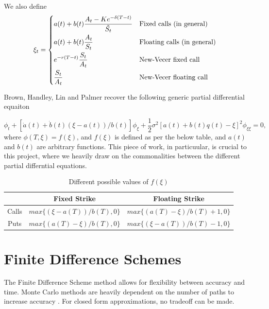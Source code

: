 \documentclass[12pt]{report}
\begin{document}
We also define
\begin{equation}
  \xi_t =
  \begin{dcases*}
    a(t) + b(t) \frac{A_t - Ke^{-\delta(T-t)}}{\tilde{S_t}} & Fixed calls (in general) \\
    a(t) + b(t) \frac{A_t}{S_t} & Floating calls (in general) \\
    e^{-r(T-t)}\frac{S_t}{A_t} & New-Vecer fixed call \\
    \frac{S_t}{A_t} & New-Vecer floating call
  \end{dcases*}
\end{equation}

Brown, Handley, Lin and Palmer\cite{main_paper} recover the following generic partial differential equaiton

\begin{equation}
  \phi_t + [\dot{a}(t) + \dot{b}(t)(\xi - a(t))/b(t)]\phi_\xi + \frac{1}{2}\sigma^2[a(t)+b(t)q(t) - \xi]^2\phi_{\xi\xi} = 0,
\end{equation}
where \(\phi(T, \xi) = f(\xi)\), and \(f(\xi)\) is defined as per the below table, and \(a(t)\) and \(b(t)\) are arbitrary functions. This piece of work, in particuular, is crucial to this project, where we heavily draw on the commonalities between the different partial differntial equations.

\begin{table}[H]
  \begin{tabular}{|c|c|c|}
    \hline
    & Fixed Strike & Floating Strike \\
    \hline
    Calls & \(max\{(\xi - a(T))/b(T), 0\}\) & \(max\{(a(T) - \xi)/b(T) + 1, 0\}\) \\
    Puts & \(max\{(a(T) - \xi)/b(T ), 0\}\) & \(max\{(\xi - a(T))/b(T) - 1, 0\}\)\\
    \hline
  \end{tabular}
  \caption{Different possible values of \(f(\xi)\)}
\end{table}

\chapter{Finite Difference Schemes}

The Finite Difference Scheme method allows for flexibility between accuracy and time. Monte Carlo methods are heavily dependent on the number of paths to increase accuracy \cite{montecarlo}. For closed form approximations, no tradeoff can be made.
\end{document}
